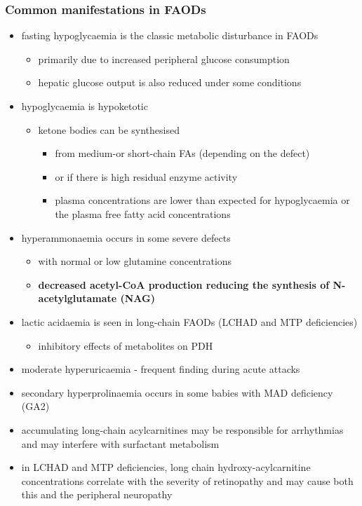 \documentclass[12pt]{scrartcl}
\begin{document}
\subsubsection{Common manifestations in FAODs}
\label{sec:org8dee1d9}
\begin{itemize}
\item fasting hypoglycaemia is the classic metabolic disturbance in FAODs
\begin{itemize}
\item primarily due to increased peripheral glucose consumption
\item hepatic glucose output is also reduced under some conditions
\end{itemize}
\item hypoglycaemia is hypoketotic
\begin{itemize}
\item ketone bodies can be synthesised
\begin{itemize}
\item from medium-or short-chain FAs (depending on the defect)
\item or if there is high residual enzyme activity
\item plasma concentrations are lower than expected for hypoglycaemia or the plasma free fatty acid concentrations
\end{itemize}
\end{itemize}
\item hyperammonaemia occurs in some severe defects
\begin{itemize}
\item with normal or low glutamine concentrations
\item \textbf{decreased acetyl-CoA production reducing the synthesis of N-acetylglutamate (NAG)}
\end{itemize}
\item lactic acidaemia is seen in long-chain FAODs (LCHAD and MTP deficiencies)
\begin{itemize}
\item inhibitory effects of metabolites on PDH
\end{itemize}
\item moderate hyperuricaemia - frequent finding during acute attacks
\item secondary hyperprolinaemia occurs in some babies with MAD deficiency (GA2)
\item accumulating long-chain acylcarnitines may be responsible for
arrhythmias and may interfere with surfactant metabolism
\item in LCHAD and MTP deficiencies, long chain hydroxy-acylcarnitine
concentrations correlate with the severity of retinopathy and may
cause both this and the peripheral neuropathy
\end{itemize}
\end{document}
